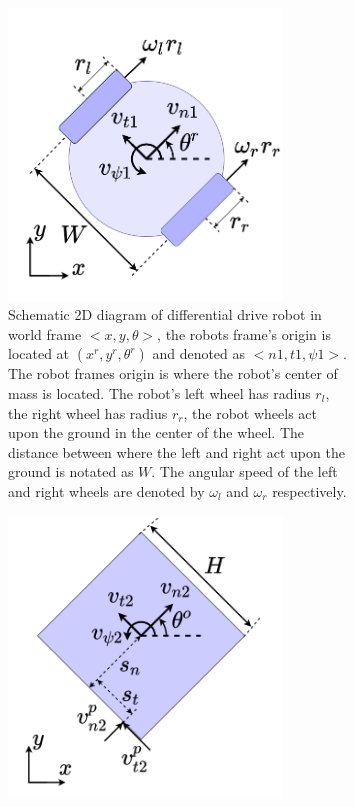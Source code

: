 \begin{figure}[ht]
\centering
\begin{subfigure}{.5\textwidth}
 \centering
    \includegraphics[width=0.8\textwidth]{figures/schematic_differential_drive_robot.png}
    \caption{Schematic 2D diagram of differential drive robot in world frame $<x, y, \theta>$, the robots frame's origin is located at $(x^r, y^r, \theta^r)$ and denoted as $<n1, t1, \psi1>$. The robot frames origin is where the robot's center of mass is located. The robot's left wheel has radius $r_l$, the right wheel has radius $r_r$, the robot wheels act upon the ground in the center of the wheel. The distance between where the left and right act upon the ground is notated as $W$. The angular speed of the left and right wheels are denoted by $\omega_l$ and $\omega_r$ respectively.}
    \label{fig: 2D_representation_robot}
\end{subfigure}%
\begin{subfigure}{.5\textwidth}
  \centering
 \includegraphics[width=0.8\textwidth]{figures/schematic_square_object.png}

\end{subfigure}
\end{figure}
